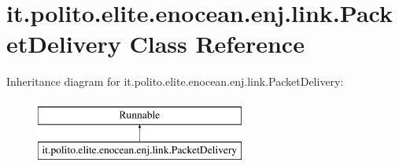 \hypertarget{classit_1_1polito_1_1elite_1_1enocean_1_1enj_1_1link_1_1_packet_delivery}{}\section{it.\+polito.\+elite.\+enocean.\+enj.\+link.\+Packet\+Delivery Class Reference}
\label{classit_1_1polito_1_1elite_1_1enocean_1_1enj_1_1link_1_1_packet_delivery}
Inheritance diagram for it.\+polito.\+elite.\+enocean.\+enj.\+link.\+Packet\+Delivery\+:\begin{figure}[H]
\begin{center}
\leavevmode
\includegraphics[height=2.000000cm]{classit_1_1polito_1_1elite_1_1enocean_1_1enj_1_1link_1_1_packet_delivery}
\end{center}
\end{figure}
